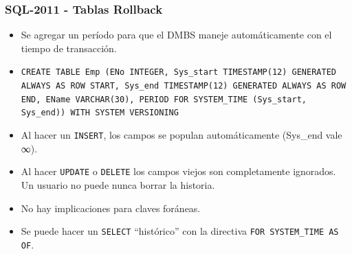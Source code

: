 \begin{frame}
\frametitle{SQL-2011 - Tablas Rollback}
	\begin{itemize}
	\item	Se agregar un período para que el DMBS maneje automáticamente
		con el tiempo de transacción.
	\pause

	\item	\texttt{CREATE TABLE Emp (ENo INTEGER, Sys\_start
		TIMESTAMP(12) GENERATED ALWAYS AS ROW START,
		Sys\_end TIMESTAMP(12) GENERATED ALWAYS AS ROW
		END, EName VARCHAR(30), PERIOD FOR SYSTEM\_TIME
		(Sys\_start, Sys\_end)) WITH SYSTEM VERSIONING}
	\pause

	\item	Al hacer un \texttt{INSERT}, los campos se populan automáticamente
		(Sys\_end vale ∞).
	\pause

	\item	Al hacer \texttt{UPDATE} o \texttt{DELETE} los campos viejos
		son completamente ignorados. Un usuario no puede nunca borrar
		la historia.
	\pause

	\item	No hay implicaciones para claves foráneas.
	\pause

	\item	Se puede hacer un \texttt{SELECT} ``histórico'' con la directiva
		\texttt{FOR SYSTEM\_TIME AS OF}.

	\end{itemize}
\end{frame}

